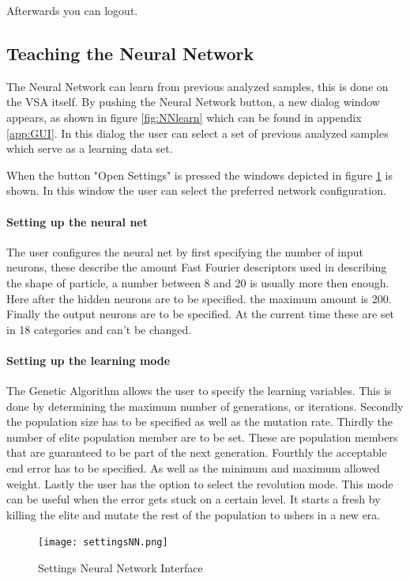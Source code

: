 \documentclass[11pt,fleqn,,a4paper,twoside,openright]{book}
\begin{document}
Afterwards you can logout.

\subsection{Teaching the Neural Network}
The Neural Network can learn from previous analyzed samples, this is done on the VSA itself. By pushing the Neural Network button, a new dialog window appears, as shown in figure \ref{fig:NNlearn} which can be found in appendix \ref{app:GUI}.  In this dialog the user can select a set of previous analyzed samples which serve as a learning data set.

When the button "Open Settings" is pressed the windows depicted in figure \ref{fig:NNsettings} is shown. In this window the user can select the preferred network configuration. 
\paragraph{Setting up the neural net}
The user configures the neural net by first specifying the number of input neurons, these describe the amount Fast Fourier descriptors used in describing the shape of particle, a number between 8 and 20 is usually more then enough. Here after the hidden neurons are to be specified. the maximum amount is 200. Finally the output neurons are to be specified. At the current time these are set in 18 categories and can't be changed.

\paragraph{Setting up the learning mode}
The Genetic Algorithm allows the user to specify the learning variables. This is done by determining the maximum number of generations, or iterations. Secondly the population size has to be specified as well as the mutation rate. Thirdly the number of elite population member are to be set. These are population members that are guaranteed to be part of the next generation. Fourthly the acceptable end error has to be specified. As well as the minimum and maximum allowed weight. Lastly the user has the option to select the revolution mode. This mode can be useful when the error gets stuck on a certain level. It starts a fresh by killing the elite and mutate the rest of the population to ushers in a new era.

\begin{figure}[h]
	\texttt{[image: settingsNN.png]}
	\caption{Settings Neural Network Interface}\label{fig:NNsettings}
\end{figure}
\end{document}

